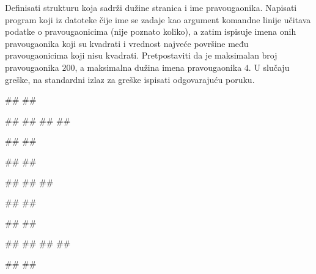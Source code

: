 \begin{Exercise}[label=p3_x1]         
Definisati strukturu  koja sadrži dužine stranica i ime pravougaonika.
Napisati program koji iz datoteke čije ime se zadaje kao argument komandne linije 
učitava podatke o pravougaonicima (nije poznato koliko), 
a zatim ispisuje imena onih pravougaonika koji su kvadrati i vrednost 
najveće površine među pravougaonicima koji nisu kvadrati.
Pretpostaviti da je maksimalan broj pravougaonika $200$, a maksimalna dužina imena pravougaonika $4$.
U slučaju greške, na standardni izlaz za greške ispisati odgovarajuću poruku.

\begin{minitest}
\begin{upotreba}{1}
#\naslovPokretanje#
##

##
##
##
##

#\naslovIzlaz#
##
\end{upotreba}
\end{minitest}
\begin{minitest}
\begin{upotreba}{2}
#\naslovPokretanje#
##

##
##
##

#\naslovIzlaz#
##
\end{upotreba}
\end{minitest}
\begin{minitest}
\begin{upotreba}{3}
#\naslovPokretanje#
##

##
##
##
##

#\naslovIzlaz#
##
\end{upotreba}
\end{minitest}

\end{Exercise}
\begin{Answer}[ref=p3_x1]
\end{Answer}


